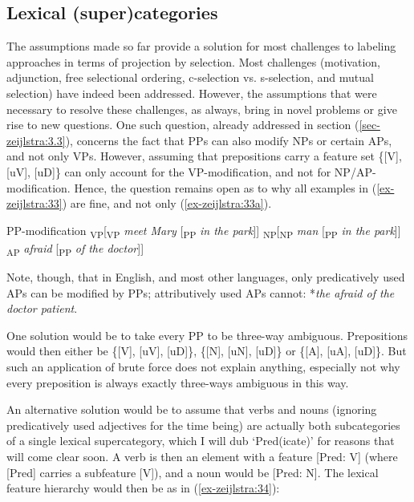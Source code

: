 \documentclass[output=paper
,modfonts
,nonflat]{langsci/langscibook}
\begin{document}
\subsection{Lexical (super)categories} \label{sec-zeijlstra:3.7}
The assumptions made so far provide a solution for most challenges to labeling approaches in terms of projection by selection. Most challenges (motivation, adjunction, free selectional ordering, c-selection vs. s-selection, and mutual selection) have indeed been addressed. However, the assumptions that were necessary to resolve these challenges, as always, bring in novel problems or give rise to new questions. One such question, already addressed in section (\ref{sec-zeijlstra:3.3}), concerns the fact that PPs can also modify NPs or certain APs, and not only VPs. However, assuming that prepositions carry a feature set \{[V], [uV], [uD]\} can only account for the VP-modification, and not for NP/AP-modification. Hence, the question remains open as to why all examples in (\ref{ex-zeijlstra:33}) are fine, and not only (\ref{ex-zeijlstra:33a}). 

\begin{exe}
\ex PP-modification \label{ex-zeijlstra:33}
	\xlist
	\ex {[}\textsubscript{VP}[\textsubscript{VP} \textit{meet Mary} [\textsubscript{PP} \textit{in the park}]{]} \label{ex-zeijlstra:33a}
	\ex {[}\textsubscript{NP}[\textsubscript{NP} \textit{man} [\textsubscript{PP} \textit{in the park}]{]}
	\ex {[}\textsubscript{AP} \textit{afraid} [\textsubscript{PP} \textit{of the doctor}]{]}
	\endxlist
\end{exe}
Note, though, that in English, and most other languages, only predicatively used APs can be modified by PPs; attributively used APs cannot: *\textit{the afraid of the doctor patient}.

One solution would be to take every PP to be three-way ambiguous. Prepositions would then either be \{[V], [uV], [uD]\}, \{[N], [uN], [uD]\} or \{[A], [uA], [uD]\}. But such an application of brute force does not explain anything, especially not why every preposition is always exactly three-ways ambiguous in this way.

An alternative solution would be to assume that verbs and nouns (ignoring predicatively used adjectives for the time being) are actually both subcategories of a single lexical supercategory, which I will dub ‘Pred(icate)’ for reasons that will come clear soon. A verb is then an element with a feature [Pred: V] (where [Pred] carries a subfeature [V]), and a noun would be [Pred: N]. The lexical feature hierarchy would then be as in (\ref{ex-zeijlstra:34}):
\end{document}

